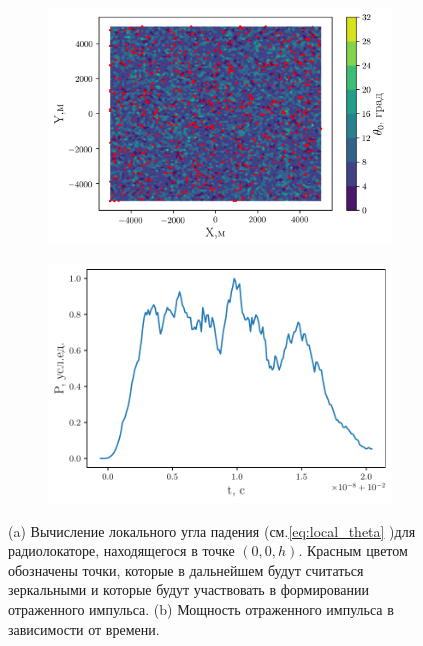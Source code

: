 \begin{figure}[h]
     \begin{subfigure}{.59\linewidth}
         \centering
         \includegraphics[width=\linewidth]{fig/model_mirrors1}
         \caption{}
     \end{subfigure}
     \begin{subfigure}{.39\linewidth}
         \centering
         \includegraphics[width=\linewidth]{fig/model_impuls1}
         \caption{}
     \end{subfigure}
     \caption{(a) Вычисление локального угла падения (см.\eqref{eq:local_theta} )для радиолокаторе,
     находящегося в точке $(0,0,h)$. Красным цветом обозначены точки, которые в
 дальнейшем будут считаться зеркальными и которые будут участвовать в
 формировании отраженного импульса.
 (b) Мощность отраженного импульса в зависимости от времени.}
    \label{fig:model_impuls}
 \end{figure}





